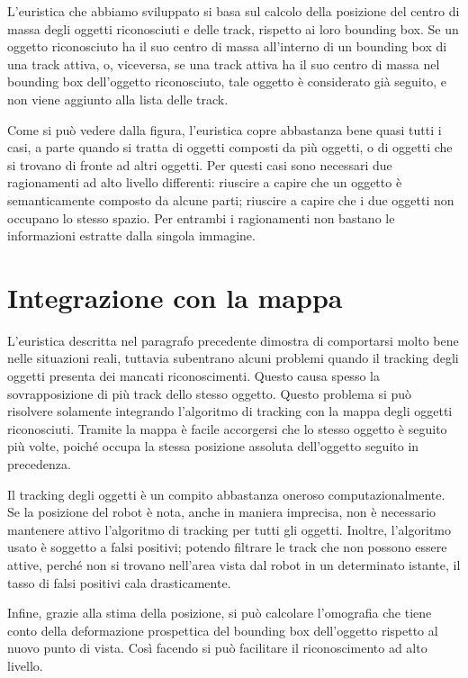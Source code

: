 L'euristica che abbiamo sviluppato si basa sul calcolo della posizione del centro di massa degli oggetti riconosciuti e delle track, rispetto ai loro bounding box.
Se un oggetto riconosciuto ha il suo centro di massa all'interno di un bounding box di una track attiva, o, viceversa, se una track attiva ha il suo centro di massa nel bounding box dell'oggetto riconosciuto, tale oggetto è considerato già seguito, e non viene aggiunto alla lista delle track.

Come si può vedere dalla figura, %
l'euristica copre abbastanza bene quasi tutti i casi, a parte quando si tratta di oggetti composti da più oggetti, o di oggetti che si trovano di fronte ad altri oggetti. Per questi casi sono necessari due ragionamenti ad alto livello differenti: riuscire a capire che un oggetto è semanticamente composto da alcune parti; riuscire a capire che i due oggetti non occupano lo stesso spazio. Per entrambi i ragionamenti non bastano le informazioni estratte dalla singola immagine.

\section{Integrazione con la mappa}
L'euristica descritta nel paragrafo precedente dimostra di comportarsi molto bene nelle situazioni reali, tuttavia subentrano alcuni problemi quando il tracking degli oggetti presenta dei mancati riconoscimenti. Questo causa spesso la sovrapposizione di più track dello stesso oggetto. Questo problema si può risolvere solamente integrando l'algoritmo di tracking con la mappa degli oggetti riconosciuti. Tramite la mappa è facile accorgersi che lo stesso oggetto è seguito più volte, poiché occupa la stessa posizione assoluta dell'oggetto seguito in precedenza.

Il tracking degli oggetti è un compito abbastanza oneroso computazionalmente. Se la posizione del robot è nota, anche in maniera imprecisa, non è necessario mantenere attivo l'algoritmo di tracking per tutti gli oggetti. Inoltre, l'algoritmo usato è soggetto a falsi positivi; potendo filtrare le track che non possono essere attive, perché non si trovano nell'area vista dal robot in un determinato istante, il tasso di falsi positivi cala drasticamente.

Infine, grazie alla stima della posizione, si può calcolare l'omografia che tiene conto della deformazione prospettica del bounding box dell'oggetto rispetto al nuovo punto di vista. Così facendo si può facilitare il riconoscimento ad alto livello.

